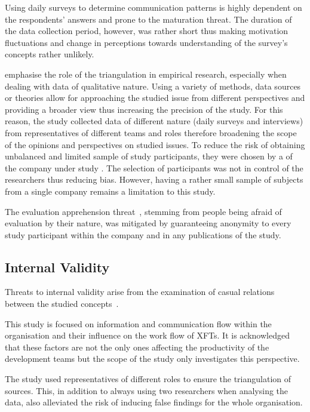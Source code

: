 Using daily surveys to determine communication patterns is highly dependent on the respondents' answers and prone to the maturation threat. The duration of the data collection period, however, was rather short thus making motivation fluctuations and change in perceptions towards understanding of the survey's concepts rather unlikely.

\citet{runeson} emphasise the role of the triangulation in empirical research, especially when dealing with data of qualitative nature. Using a variety of methods, data sources or theories allow for approaching the studied issue from different perspectives and providing a broader view thus increasing the precision of the study. For this reason, the study collected data of different nature (daily surveys and interviews) from representatives of different teams and roles therefore broadening the scope of the opinions and perspectives on studied issues. To reduce the risk of obtaining unbalanced and limited sample of study participants, they were chosen by a  of the company under study \citep{shenton2004strat}. The selection of participants was not in control of the researchers thus reducing bias. However, having a rather small sample of subjects from a single company remains a limitation to this study.

The evaluation apprehension threat~\citep{wohlin2012expse}, stemming from people being afraid of evaluation by their nature, was mitigated by guaranteeing anonymity to every study participant within the company and in any publications of the study.

\subsection{Internal Validity}

Threats to internal validity arise from the examination of casual relations between the studied concepts~\citep{runeson}.

This study is focused on information and communication flow within the organisation and their influence on the work flow of \acp{XFT}. It is acknowledged that these factors are not the only ones affecting the productivity of the development teams but the scope of the study only investigates this perspective.

The study used representatives of different roles to ensure the triangulation of sources. This, in addition to always using two researchers when analysing the data, also alleviated the risk of inducing false findings for the whole organisation. 

